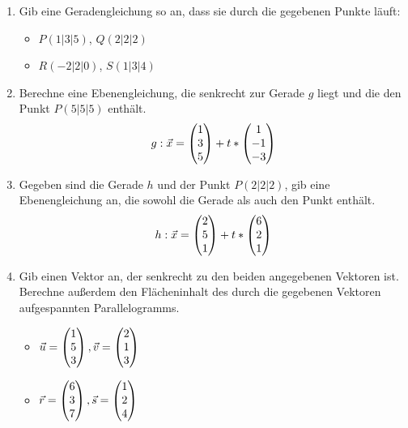 	\begin{enumerate}
		\item Gib eine Geradengleichung so an, dass sie durch die gegebenen Punkte läuft:
		\begin{itemize}
			\item $P(1|3|5)$, $Q(2|2|2)$
			\item $R(-2|2|0)$, $S(1|3|4)$
		\end{itemize}
		\item Berechne eine Ebenengleichung, die senkrecht zur Gerade $g$ liegt und die den Punkt $P(5|5|5)$ enthält.
		\begin{equation*}
			g:\vec x=\begin{pmatrix} 1\\3\\5 \end{pmatrix}+t*\begin{pmatrix} 1\\-1\\-3 \end{pmatrix}
		\end{equation*}
		\item Gegeben sind die Gerade $h$ und der Punkt $P(2|2|2)$, gib eine Ebenengleichung an, die sowohl die Gerade als auch den Punkt enthält.
		\begin{equation*}
			h:\vec x=\begin{pmatrix} 2\\5\\1 \end{pmatrix}+t*\begin{pmatrix} 6\\2\\1 \end{pmatrix}
		\end{equation*}
		\item Gib einen Vektor an, der senkrecht zu den beiden angegebenen Vektoren ist. Berechne außerdem den Flächeninhalt des durch die gegebenen Vektoren aufgespannten Parallelogramms.
		\begin{itemize}
			\item$\vec u=\begin{pmatrix} 1\\5\\3 \end{pmatrix},\vec v=\begin{pmatrix} 2\\1\\3 \end{pmatrix}$
			\item$\vec r=\begin{pmatrix} 6\\3\\7 \end{pmatrix},\vec s=\begin{pmatrix} 1\\2\\4 \end{pmatrix}$
		\end{itemize}
	\end{enumerate}

